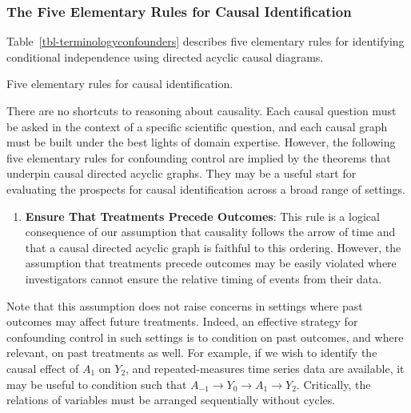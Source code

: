 \documentclass[
  single column]{article}
\providecommand{\tightlist}{%
  \setlength{\itemsep}{0pt}\setlength{\parskip}{0pt}}\usepackage{longtable,booktabs,array}
\begin{document}
\newpage{}

\subsubsection{The Five Elementary Rules for Causal
Identification}\label{the-five-elementary-rules-for-causal-identification}

Table~\ref{tbl-terminologyconfounders} describes five elementary rules
for identifying conditional independence using directed acyclic causal
diagrams.

\begin{table}

\caption{\label{tbl-terminologyconfounders}Five elementary rules for
causal identification.}

\centering{

\terminologyelconfounders

}

\end{table}%

There are no shortcuts to reasoning about causality. Each causal
question must be asked in the context of a specific scientific question,
and each causal graph must be built under the best lights of domain
expertise. However, the following five elementary rules for confounding
control are implied by the theorems that underpin causal directed
acyclic graphs. They may be a useful start for evaluating the prospects
for causal identification across a broad range of settings.

\begin{enumerate}
\def\labelenumi{\arabic{enumi}.}
\tightlist
\item
  \textbf{Ensure That Treatments Precede Outcomes}: This rule is a
  logical consequence of our assumption that causality follows the arrow
  of time and that a causal directed acyclic graph is faithful to this
  ordering. However, the assumption that treatments precede outcomes may
  be easily violated where investigators cannot ensure the relative
  timing of events from their data.
\end{enumerate}

Note that this assumption does not raise concerns in settings where past
outcomes may affect future treatments. Indeed, an effective strategy for
confounding control in such settings is to condition on past outcomes,
and where relevant, on past treatments as well. For example, if we wish
to identify the causal effect of \(A_1\) on \(Y_2\), and
repeated-measures time series data are available, it may be useful to
condition such that
\(\boxed{A_{-1}} \to \boxed{Y_0} \to A_1 \rightarrow Y_2\). Critically,
the relations of variables must be arranged sequentially without cycles.
\end{document}
